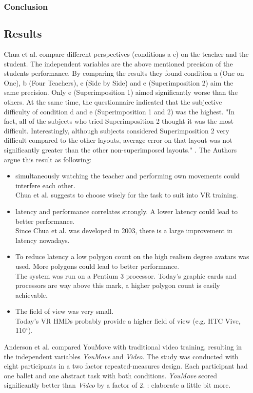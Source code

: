 \subsubsection{Conclusion}

\subsection{Results}
Chua et al. compare different perspectives (conditions a-e) on the teacher and the student. The independent variables are the above mentioned precision of the students performance. By comparing the results they found condition a (One on One), b (Four Teachers), c (Side by Side) and e (Superimposition 2) aim the same precision. Only e (Superimposition 1) aimed significantly worse than the others. At the same time, the questionnaire indicated that the subjective difficulty of condition d and e (Superimposition 1 and 2) was the highest. "In fact, all of the subjects who tried Superimposition 2 thought it was the most difficult. Interestingly, although subjects considered Superimposition 2 very difficult compared to the other layouts, average error on that layout was not significantly greater than the other non-superimposed layouts." \cite{Chua}. The Authors argue this result as following:
\begin{itemize}
	\item simultaneously watching the teacher and performing own movements could interfere each other.\\
	Chua et al. suggests to choose wisely for the task to suit into VR training.
	\item latency and performance correlates strongly. A lower latency could lead to better performance.\\
	Since Chua et al. \cite{Chua} was developed in 2003, there is a large improvement in latency nowadays.
	\item To reduce latency a low polygon count on the high realism degree avatars was used. More polygons could lead to better performance.\\
	The system was run on a Pentium 3 processor. Today's graphic cards and processors are way above this mark, a higher polygon count is easily achievable.
	\item The field of view was very small.\\
	Today's VR HMDs probably provide a higher field of view (e.g. HTC Vive, 110$^\circ$).
\end{itemize}
Anderson et al. compared YouMove with traditional video training, resulting in the independent variables \textit{YouMove} and \textit{Video}. The study was conducted with eight participants in a two factor repeated-measures design. Each participant had one ballet and one abstract task with both conditions. \textit{YouMove} scored significantly better than \textit{Video} by a factor of 2. \todo: elaborate a little bit more.
